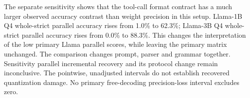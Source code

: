 The separate sensitivity shows that the tool-call format contract has a much larger observed accuracy contrast than weight precision in this setup. Llama-1B Q4 whole-strict parallel accuracy rises from 1.0\% to 62.3\%; Llama-3B Q4 whole-strict parallel accuracy rises from 0.0\% to 88.3\%. This changes the interpretation of the low primary Llama parallel scores, while leaving the primary matrix unchanged. The comparison changes prompt, parser and grammar together. Sensitivity parallel incremental recovery and its protocol change remain inconclusive. The pointwise, unadjusted intervals do not establish recovered quantization damage. No primary free-decoding precision-loss interval excludes zero.
